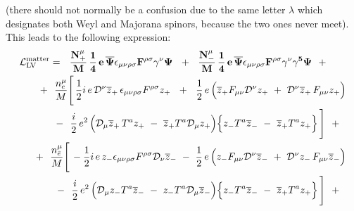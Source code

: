 \documentclass[paper,12pt]{revtex4}
\newcommand{\slashed}[1]{\hbox{{$#1$}\llap{$/$}}}
\begin{document}
	(there should not normally be a confusion due to the
	same letter $ \lambda $ which designates both Weyl
	and Majorana spinors, because the two ones never meet).
	This leads to the following expression:
\begin{eqnarray}
\nonumber
\lefteqn{
     \mathcal{L}_{\mathrm{LV}}^{\mathrm{matter}}  = 
	~~      %
\mathbf{
	\frac{N_+^\mu}{M}\,
	\frac{1}{4} \,e\,
	\overline{\Psi} \epsilon_{\mu\nu\rho\sigma}
	F^{\rho\sigma} \gamma^\nu \Psi 
     }
	~~+~~
\mathbf{
	\frac{N_-^\mu}{M}\,
	\frac{1}{4} \,e\,
	\overline{\Psi} \epsilon_{\mu\nu\rho\sigma}
	F^{\rho\sigma} \gamma^\nu \gamma^5 \Psi 
     }
	~~+~~ 
	}\\
\nonumber
&&
	~~+~~
	\frac{n_e^\mu}{M}
	\Bigg[\,
		\frac{1}{2}i \,e \, 
		\mathcal{D}^\nu \overline{z}_+ \,
		\epsilon_{\mu\nu\rho\sigma}F^{\rho\sigma} z_+ 
		~~+~~
		\frac{1}{2}\, e\,
		\Big(
		  \overline{z}_+ F_{\mu\nu}
		  \mathcal{D}^\nu z_+ 
		  ~+~
		  \mathcal{D}^\nu \overline{z}_+ \,
		  F_{\mu\nu} z_+
		\Big) 
		\\
\nonumber
&&
               \qquad
		~~-~~
		\frac{i}{2}\, e^2\,
		\Big(
		  \mathcal{D}_\mu \overline{z}_+ \,
		  T^a z_+ 
		  ~-~
		  \overline{z}_+ T^a \mathcal{D}_\mu z_+
		\Big)
		\Big\{
		  z_- T^a \overline{z}_- 
		  ~-~
		  \overline{z}_+ T^a z_+
		\Big\}
	\,\Bigg] ~~+~~ \\
\nonumber
&&
	~~+~~
	\frac{n_{\bar{e}}^\mu}{M}
	\Bigg[\,
		- \frac{1}{2} i\, e\,
		z_- \epsilon_{\mu\nu\rho\sigma}F^{\rho\sigma}
		\mathcal{D}_\nu \overline{z}_- 
		~-~
		\frac{1}{2}\, e\,
		\Big(
		  z_- F_{\mu\nu}\mathcal{D}^\nu \overline{z}_- 
		  ~+~
		  \mathcal{D}^\nu z_- \,
		  F_{\mu\nu} \overline{z}_- 
		\Big)
		\\
\nonumber
&&
               \qquad
		~~-~~ 
		\frac{i}{2}\, e^2\,
		\Big(
		  \mathcal{D}_\mu z_- T^a \overline{z}_-
		  ~-~
		  z_- T^a \mathcal{D}_\mu \overline{z}_-
		\Big)
		\Big\{
		  z_- T^a \overline{z}_- 
		  ~-~
		  \overline{z}_+ T^a z_+
		\Big\}
	\,\Bigg]
	~~+~~ \\

\end{eqnarray}
\end{document}
